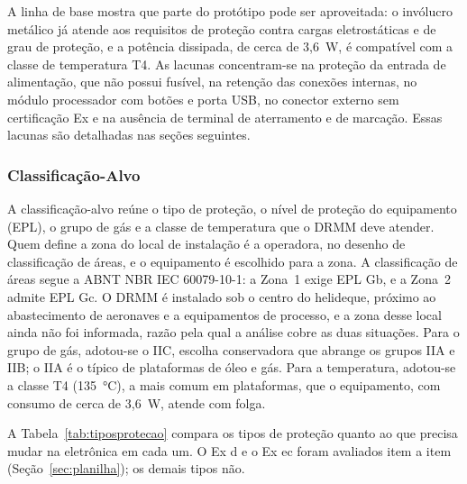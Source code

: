 \documentclass[a4paper, 12pt]{article}
\begin{document}
A linha de base mostra que parte do protótipo pode ser aproveitada: o invólucro metálico já atende aos requisitos de proteção contra cargas eletrostáticas e de grau de proteção, e a potência dissipada, de cerca de 3,6~W, é compatível com a classe de temperatura T4. As lacunas concentram-se na proteção da entrada de alimentação, que não possui fusível, na retenção das conexões internas, no módulo processador com botões e porta USB, no conector externo sem certificação Ex e na ausência de terminal de aterramento e de marcação. Essas lacunas são detalhadas nas seções seguintes.

\subsubsection{Classificação-Alvo}\label{sec:classalvo}

A classificação-alvo reúne o tipo de proteção, o nível de proteção do equipamento (EPL), o grupo de gás e a classe de temperatura que o DRMM deve atender. Quem define a zona do local de instalação é a operadora, no desenho de classificação de áreas, e o equipamento é escolhido para a zona. A classificação de áreas segue a ABNT NBR IEC 60079-10-1: a Zona~1 exige EPL Gb, e a Zona~2 admite EPL Gc. O DRMM é instalado sob o centro do helideque, próximo ao abastecimento de aeronaves e a equipamentos de processo, e a zona desse local ainda não foi informada, razão pela qual a análise cobre as duas situações. Para o grupo de gás, adotou-se o IIC, escolha conservadora que abrange os grupos IIA e IIB; o IIA é o típico de plataformas de óleo e gás. Para a temperatura, adotou-se a classe T4 (135~°C), a mais comum em plataformas, que o equipamento, com consumo de cerca de 3,6~W, atende com folga.

A Tabela~\ref{tab:tiposprotecao} compara os tipos de proteção quanto ao que precisa mudar na eletrônica em cada um. O Ex d e o Ex ec foram avaliados item a item (Seção~\ref{sec:planilha}); os demais tipos não.
\end{document}
